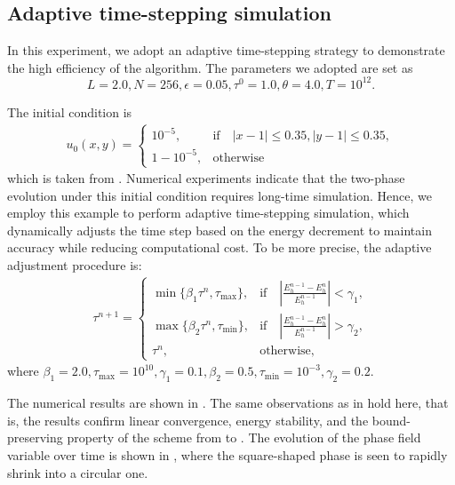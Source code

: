 \subsection{Adaptive time-stepping simulation}\label{subsec:Adaptive}
In this experiment, we adopt an adaptive time-stepping strategy to demonstrate the high efficiency of the algorithm. 
The parameters we adopted are set as
\begin{equation}
L=2.0, N=256,\epsilon = 0.05, \tau^0=1.0,\theta=4.0, T=10^{12}.
\end{equation}
\par The initial condition is
\begin{align}
u_0(x,y)=
\begin{cases}
    10^{-5},&\text{if}\quad |x-1|\leq 0.35, |y-1|\leq 0.35,\\
    1-10^{-5},&\text{otherwise}
\end{cases}
\end{align}
which is taken from \cite{wang2020stabilized}.
Numerical experiments indicate that the two-phase evolution under this initial condition requires long-time simulation. 
Hence, we employ this example to perform adaptive time-stepping simulation, 
which dynamically adjusts the time step based on the energy decrement to maintain accuracy while reducing computational cost.
To be more precise, the adaptive adjustment procedure is:
\begin{align}
\tau^{n+1}=
\begin{cases}
\min \{\beta_1 \tau^{n},\tau_{\max}\},&\text{if} \quad |\frac{E_h^{n-1}-E_h^n}{E_h^{n-1}}|<\gamma_1,\\
\max \{\beta_2 \tau^{n},\tau_{\min}\},&\text{if} \quad |\frac{E_h^{n-1}-E_h^n}{E_h^{n-1}}|>\gamma_2,\\
\tau^n,&\text{otherwise},
\end{cases}
\end{align}
where $\beta_1=2.0,\tau_{\max}=10^{10},\gamma_1=0.1,\beta_2=0.5,\tau_{\min}=10^{-3},\gamma_2=0.2$.
\par The numerical results are shown in . 
The same observations as in  hold here, that is, 
the results confirm linear convergence, energy stability, and the bound-preserving property of the scheme from  to .
The evolution of the phase field variable over time is shown in , where the square-shaped phase is seen to rapidly shrink into a circular one.

